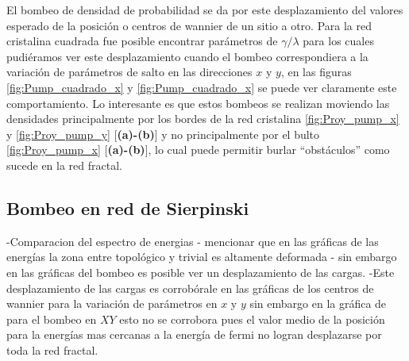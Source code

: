 El bombeo de densidad de probabilidad se da por este desplazamiento del valores esperado de la posición o centros de wannier de un sitio a otro. Para la red cristalina cuadrada fue posible encontrar parámetros de $\gamma/\lambda$ para los cuales pudiéramos ver este desplazamiento cuando el bombeo correspondiera a la variación de parámetros de salto en las direcciones $x$ y $y$, en las figuras \ref{fig:Pump_cuadrado_x}  y \ref{fig:Pump_cuadrado_x}  se puede ver claramente este comportamiento. Lo interesante es que estos bombeos se realizan moviendo las densidades principalmente por los bordes de la red cristalina \ref{fig:Proy_pump_x} y \ref{fig:Proy_pump_y} [\textbf{(a)-(b)}] y no principalmente por el bulto \ref{fig:Proy_pump_x}  [\textbf{(a)-(b)}], lo cual puede permitir burlar ``obstáculos'' como sucede en la red fractal.





















\subsection{Bombeo en red de Sierpinski}
-Comparacion del espectro de energias
- mencionar que en las gráficas de las energías la zona entre topológico y trivial es altamente deformada 
- sin embargo en las gráficas del bombeo es posible ver un desplazamiento de las cargas.
-Este desplazamiento de las cargas es corrobórale en las gráficas de los centros de wannier para la variación de parámetros en $x$ y $y$ sin embargo en la gráfica de para el bombeo en $XY$ esto no se corrobora pues el valor medio de la posición para la energías mas cercanas a la energía de fermi no logran desplazarse por toda la red fractal. 



















